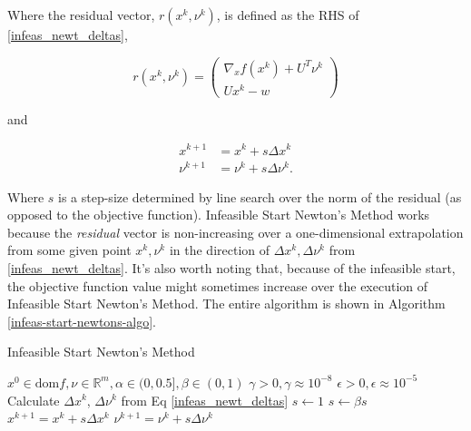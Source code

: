 \documentclass{exam}
\begin{document}
\begin{multicols*}{2}
Where the residual vector, $r(x^k, \nu^k)$, is defined as the RHS of \eqref{infeas_newt_deltas},

\begin{equation}
    r(x^k, \nu^k) = \begin{pmatrix}
        \nabla_xf(x^k) + U^T \nu^k \\
        Ux^k - w
    \end{pmatrix}
\end{equation}

and 

\begin{equation}
    \begin{aligned}
        x^{k+1} &= x^k + s \Delta x^k \\
        \nu^{k+1} &= \nu^k + s \Delta \nu^k .
    \end{aligned}
\end{equation}

Where $s$ is a step-size determined by line search over the norm of the residual (as opposed to the objective function). Infeasible Start Newton's Method works because the \textit{residual} vector is non-increasing over a one-dimensional extrapolation from some given point $x^k, \nu^k$ in the direction of $\Delta x^k, \Delta \nu^k$ from \eqref{infeas_newt_deltas}. It's also worth noting that, because of the infeasible start, the objective function value might sometimes increase over the execution of Infeasible Start Newton's Method. The entire algorithm is shown in Algorithm \ref{infeas-start-newtons-algo}.

\end{multicols*}

\begin{algorithm}
    \caption{Infeasible Start Newton's Method}
    \label{infeas-start-newtons-algo}
    \begin{algorithmic}
        \Require $x^0 \in \textrm{dom} f, \nu \in \mathbb{R}^m, \alpha \in (0, 0.5], \beta \in (0, 1)$
        \Require $\gamma >0, \gamma \approx 10^{-8}$ 
        \Require $\epsilon >0, \epsilon \approx 10^{-5}$ 
            \State Calculate $\Delta x^k$, $\Delta \nu^k$ from Eq \eqref{infeas_newt_deltas}
            \State $s \gets 1$
                \State $s \gets \beta s$
            \EndWhile
            \State $x^{k+1} = x^k + s \Delta x^k$
            \State $\nu^{k+1} = \nu^k + s \Delta \nu^k$
        \EndWhile
    \end{algorithmic}
\end{algorithm}
\end{document}
